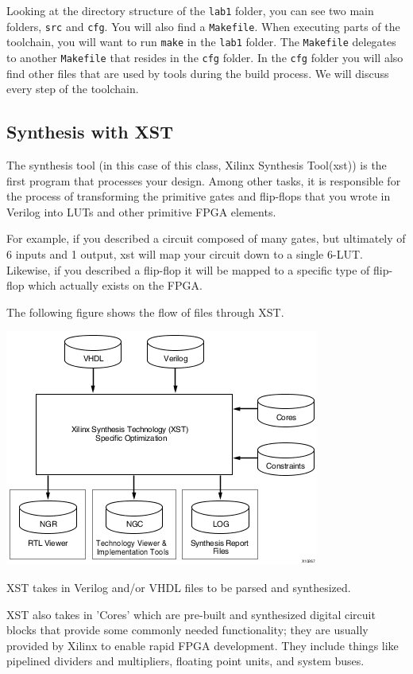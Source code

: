 \documentclass[11pt]{article}
\begin{document}
Looking at the directory structure of the \verb|lab1| folder, you can see two main folders, \verb|src| and \verb|cfg|. You will also find a \verb|Makefile|. When executing parts of the toolchain, you will want to run \verb|make| in the \verb|lab1| folder. The \verb|Makefile| delegates to another \verb|Makefile| that resides in the \verb|cfg| folder. In the \verb|cfg| folder you will also find other files that are used by tools during the build process. We will discuss every step of the toolchain.

\subsection{Synthesis with XST}
The synthesis tool (in this case of this class, Xilinx Synthesis Tool(xst)) is the first program that processes your design. Among other tasks, it is responsible for the process of transforming the primitive gates and flip-flops that you wrote in Verilog into LUTs and other primitive FPGA elements.

For example, if you described a circuit composed of many gates, but ultimately of 6 inputs and 1 output, xst will map your circuit down to a single 6-LUT. Likewise, if you described a flip-flop it will be mapped to a specific type of flip-flop which actually exists on the FPGA.

The following figure shows the flow of files through XST.

\begin{center}
	\includegraphics{images/xst_design_flow.png}
\end{center}

XST takes in Verilog and/or VHDL files to be parsed and synthesized.

XST also takes in 'Cores' which are pre-built and synthesized digital circuit blocks that provide some commonly needed functionality; they are usually provided by Xilinx to enable rapid FPGA development. They include things like pipelined dividers and multipliers, floating point units, and system buses.
\end{document}
